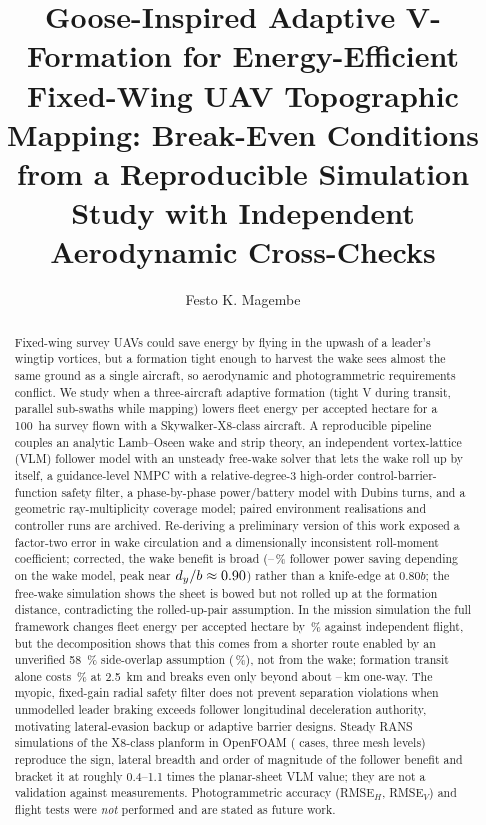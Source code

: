 \documentclass[preprint,12pt]{elsarticle}
\begin{document}
\begin{frontmatter}
\title{Goose-Inspired Adaptive V-Formation for Energy-Efficient Fixed-Wing UAV Topographic Mapping: Break-Even Conditions from a Reproducible Simulation Study with Independent Aerodynamic Cross-Checks}

\author[inst1]{Festo K. Magembe}

\begin{abstract}
Fixed-wing survey UAVs could save energy by flying in the upwash of a leader's wingtip vortices, but a formation tight enough to harvest the wake sees almost the same ground as a single aircraft, so aerodynamic and photogrammetric requirements conflict.
We study when a three-aircraft adaptive formation (tight V during transit, parallel sub-swaths while mapping) lowers fleet energy per accepted hectare for a \SI{100}{ha} survey flown with a Skywalker-X8-class aircraft.
A reproducible pipeline couples an analytic Lamb--Oseen wake and strip theory, an independent vortex-lattice (VLM) follower model with an unsteady free-wake solver that lets the wake roll up by itself, a guidance-level NMPC with a relative-degree-3 high-order control-barrier-function safety filter, a phase-by-phase power/battery model with Dubins turns, and a geometric ray-multiplicity coverage model; \nnTrials{} paired environment realisations and \nnControl{} controller runs are archived.
Re-deriving a preliminary version of this work exposed a factor-two error in wake circulation and a dimensionally inconsistent roll-moment coefficient; corrected, the wake benefit is broad (\npeakFree--\npeakSheet\,\% follower power saving depending on the wake model, peak near $d_y/b\approx0.90$) rather than a knife-edge at $0.80b$; the free-wake simulation shows the sheet is bowed but not rolled up at the formation distance, contradicting the rolled-up-pair assumption.
In the mission simulation the full framework changes fleet energy per accepted hectare by \nrelASheet\,\% against independent flight, but the decomposition shows that this comes from a shorter route enabled by an unverified \SI{58}{\percent} side-overlap assumption (\nrelFSheet\,\%), not from the wake; formation transit alone costs \nrelBSheet\,\% at \SI{2.5}{km} and breaks even only beyond about \nbeSevSheet--\nbeSevFree\,km one-way.
The myopic, fixed-gain radial safety filter does not prevent separation violations when unmodelled leader braking exceeds follower longitudinal deceleration authority, motivating lateral-evasion backup or adaptive barrier designs.
Steady RANS simulations of the X8-class planform in OpenFOAM (\ncfdNcases{} cases, three mesh levels) reproduce the sign, lateral breadth and order of magnitude of the follower benefit and bracket it at roughly 0.4--1.1 times the planar-sheet VLM value; they are not a validation against measurements. Photogrammetric accuracy (RMSE$_H$, RMSE$_V$) and flight tests were \emph{not} performed and are stated as future work.
\end{abstract}


\end{frontmatter}
\end{document}
